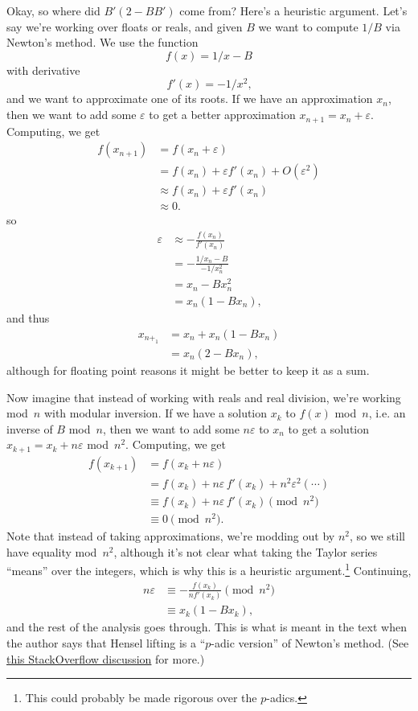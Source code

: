 \documentclass{computer-arithmetic}
\begin{document}
Okay, so where did \(B'(2 - BB')\) come from? Here's a heuristic
argument. Let's say we're working over floats or reals, and given
\(B\) we want to compute \(1/B\) via Newton's method. We use the
function
\[
  f(x) = 1/x - B
\]
with derivative
\[
  f'(x) = -1/x^2\text{,}
\]
and we want to approximate one of its roots. If we have an
approximation \(x_n\), then we want to add some \(ε\) to get a better
approximation \(x_{n + 1} = x_n + ε\). Computing, we get
\begin{align*}
  f(x_{n + 1}) &= f(x_n + ε) \\
               &= f(x_n) + ε f'(x_n) + O(ε^2) \\
               &≈ f(x_n) + ε f'(x_n) \\
               &≈ 0\text{.}
\end{align*}
so
\begin{align*}
  ε &≈ -\frac{f(x_n)}{f'(x_n)} \\
    &= -\frac{1/x_n - B}{-1/x_n^2} \\
    &= x_n - B x_n^2 \\
    &= x_n(1 - B x_n)\text{,}
\end{align*}
and thus
\begin{align*}
  x_{n +_1} &= x_n + x_n(1 - B x_n) \\
          &= x_n(2 - B x_n)\text{,}
\end{align*}
although for floating point reasons it might be better to keep it as a
sum.

Now imagine that instead of working with reals and real division,
we're working mod~\(n\) with modular inversion. If we have a solution
\(x_k\) to \(f(x)\) mod~\(n\), i.e. an inverse of \(B\) mod~\(n\),
then we want to add some \(nε\) to \(x_n\) to get a
solution \(x_{k+1} = x_k + nε\) mod~\(n^2\). Computing, we get
\begin{align*}
  f(x_{k+1}) &= f(x_k + nε) \\
             &= f(x_k) + nε \, f'(x_k) + n^2ε^2(⋯) \\
             &≡ f(x_k) + nε \, f'(x_k) \pmod{n^2} \\
             &≡ 0 \pmod{n^2} \text{.}
\end{align*}
Note that instead of taking approximations, we're modding out by
\(n^2\), so we still have equality mod~\(n^2\), although it's not
clear what taking the Taylor series ``means'' over the integers, which
is why this is a heuristic argument.\footnote{This could probably be
  made rigorous over the \(p\)-adics.} Continuing,
\begin{align*}
  nε &≡ -\frac{f(x_k)}{n f'(x_k)} \pmod{n^2} \\
    &≡ x_k(1 - B x_k)\text{,}
\end{align*}
and the rest of the analysis goes through. This is what is meant in
the text when the author says that Hensel lifting is a ``\(p\)-adic
version'' of Newton's method. (See
\href{https://math.stackexchange.com/questions/709533/what-is-the-difference-between-hensel-lifting-and-the-newton-raphson-method}{this
  StackOverflow discussion} for more.)
\end{document}
